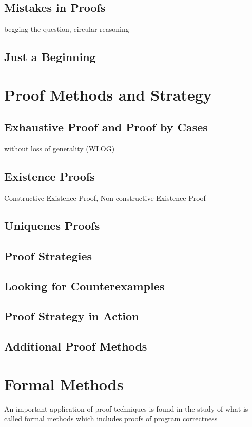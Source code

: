 \documentclass[11pt]{book} %
\theoremstyle {definition}
\theoremstyle {remark}
\begin{document}
    \subsection {Mistakes in Proofs}
    begging the question, circular reasoning
    \subsection {Just a Beginning}
  
\section {Proof Methods and Strategy}
    \subsection {Exhaustive Proof and Proof by Cases}
    without loss of generality (WLOG)
    \subsection {Existence Proofs}
    Constructive Existence Proof, Non-constructive Existence Proof
    \subsection {Uniquenes Proofs}
    
    \subsection {Proof Strategies}
    \subsection {Looking for Counterexamples}
    \subsection {Proof Strategy in Action}
    \subsection {Additional Proof Methods}

\section{Formal Methods}
An important application of proof techniques is found in the study of what is called formal methods which includes proofs of program correctness
\end{document}
